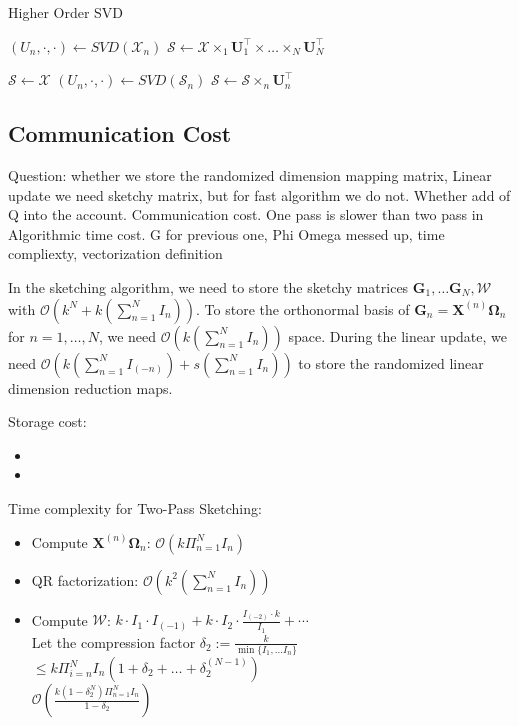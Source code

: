 \begin{algorithm}[ht]
\caption{Higher Order SVD}\label{alg:hosvd}
  \begin{algorithmic}[2]
  \State $(U_n, \cdot, \cdot) \leftarrow SVD(\mathscr{X}_n)$
  \EndFor
  \State $\mathscr{S} \leftarrow \mathscr{X}\times_1 \mathbf{U}_1^\top \times \dots \times_N \mathbf{U}_N^\top$
  \EndFunction
  
  \State $\mathscr{S} \leftarrow \mathscr{X}$
  \State $(U_n, \cdot, \cdot) \leftarrow SVD(\mathscr{S}_n)$
  \State $\mathscr{S} \leftarrow \mathscr{S}\times_n \mathbf{U}_n^\top $
  \EndFor
  \EndFunction
\end{algorithmic}
\end{algorithm}


\subsection{Communication Cost}


\ifcomment
{\color{red} Question: whether we store the randomized dimension mapping matrix, Linear update we need sketchy matrix, but for fast algorithm we do not. Whether add of Q into the account. Communication cost. One pass is slower than two pass in Algorithmic time cost. G for previous one, Phi Omega messed up, time compliexty, vectorization definition }
\fi 


In the sketching algorithm, we need to store the sketchy matrices $\mathbf{G}_1, \dots \mathbf{G}_N, \mathscr{W}$ with $\mathcal{O}(k^N+k(\sum_{n = 1}^N I_n))$. To store the orthonormal basis of $\mathbf{G}_n = \mathbf{X}^{(n)} \mathbf{\Omega}_n$ for $n = 1, \dots, N$, we need $\mathcal{O}(k(\sum_{n=1}^N I_n))$ space. During the linear update, we need $\mathcal{O}(k(\sum_{n =1}^N I_{(-n)}) + s(\sum_{n =1}^N I_n))$ to store the randomized linear dimension reduction maps. 

Storage cost: \\ 
\begin{itemize}
    \item 
    \item 
\end{itemize}

Time complexity for Two-Pass Sketching: \\ 
\begin{itemize}
    \item Compute $\mathbf{X}^{(n)} \mathbf{\Omega}_n$: $\mathcal{O}(k \Pi_{n=1}^N I_n)$ 
    \item QR factorization: $\mathcal{O}(k^2(\sum_{n =1}^N I_n )) $  
    \item Compute $\mathscr{W}$: $k\cdot I_1 \cdot I_{(-1)} + k \cdot I_2 \cdot \frac{I_{(-2)}\cdot k}{I_1} + \cdots$ \\   
    Let the compression factor $\delta_2:= \frac{k}{\min\{I_1, \dots I_n\}}$ \\ 
    $\leq k\Pi_{i=n}^N I_n (1 + \delta_2+ \dots + \delta_2^{(N-1)})$ \\ 
    $\mathcal{O}(\frac{k(1-\delta_2^N)\Pi_{n = 1}^N I_n}{1-\delta_2}) $
\end{itemize}


